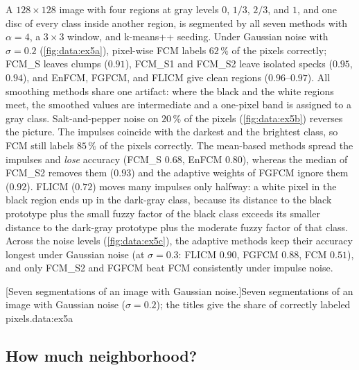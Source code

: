 A $128\times128$ image with four regions at gray levels $0$, $1/3$, $2/3$, and $1$, and one disc of every class inside another region, is segmented by all seven methods with $\alpha=4$, a $3\times3$ window, and k-means++ seeding. Under Gaussian noise with $\sigma=0.2$ (\cref{fig:data:ex5a}), pixel-wise FCM labels $62\,\%$ of the pixels correctly; FCM\_S leaves clumps ($0.91$), FCM\_S1 and FCM\_S2 leave isolated specks ($0.95$, $0.94$), and EnFCM, FGFCM, and FLICM give clean regions ($0.96$--$0.97$). All smoothing methods share one artifact: where the black and the white regions meet, the smoothed values are intermediate and a one-pixel band is assigned to a gray class. Salt-and-pepper noise on $20\,\%$ of the pixels (\cref{fig:data:ex5b}) reverses the picture. The impulses coincide with the darkest and the brightest class, so FCM still labels $85\,\%$ of the pixels correctly. The mean-based methods spread the impulses and \emph{lose} accuracy (FCM\_S $0.68$, EnFCM $0.80$), whereas the median of FCM\_S2 removes them ($0.93$) and the adaptive weights of FGFCM ignore them ($0.92$). FLICM ($0.72$) moves many impulses only halfway: a white pixel in the black region ends up in the dark-gray class, because its distance to the black prototype plus the small fuzzy factor of the black class exceeds its smaller distance to the dark-gray prototype plus the moderate fuzzy factor of that class. Across the noise levels (\cref{fig:data:ex5c}), the adaptive methods keep their accuracy longest under Gaussian noise (at $\sigma=0.3$: FLICM $0.90$, FGFCM $0.88$, FCM $0.51$), and only FCM\_S2 and FGFCM beat FCM consistently under impulse noise.

[Seven segmentations of an image with Gaussian noise.]{Seven segmentations of an image with Gaussian noise ($\sigma=0.2$); the titles give the share of correctly labeled pixels.}{data:ex5a}

\subsection{How much neighborhood?}

